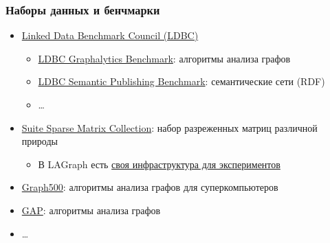 \documentclass[xcolor=table,aspectratio=169]{beamer}
\begin{document}
\begin{frame}[fragile]
  \frametitle{Наборы данных и бенчмарки}
  \begin{itemize}
    \item \href{https://ldbcouncil.org/benchmarks/overview/}{Linked Data Benchmark Council (LDBC)}
      \begin{itemize}
        \item \href{https://ldbcouncil.org/benchmarks/graphalytics/}{LDBC Graphalytics Benchmark}: алгоритмы анализа графов
        \item \href{https://ldbcouncil.org/benchmarks/spb/}{LDBC Semantic Publishing Benchmark}: семантические сети (RDF)
        \item \ldots
      \end{itemize}
      \item \href{http://sparse.tamu.edu/}{Suite Sparse Matrix Collection}: набор разреженных матриц различной природы
      \begin{itemize}
        \item В LAGraph есть \href{https://github.com/GraphBLAS/LAGraph/tree/stable/src/benchmark}{своя инфраструктура для экспериментов}
      \end{itemize}
      \item \href{https://graph500.org/?page_id=12}{Graph500}: алгоритмы анализа графов для суперкомпьютеров
      \item \href{http://gap.cs.berkeley.edu/benchmark.html}{GAP}: алгоритмы анализа графов
      \item \ldots
  \end{itemize}
\end{frame}
\end{document}

